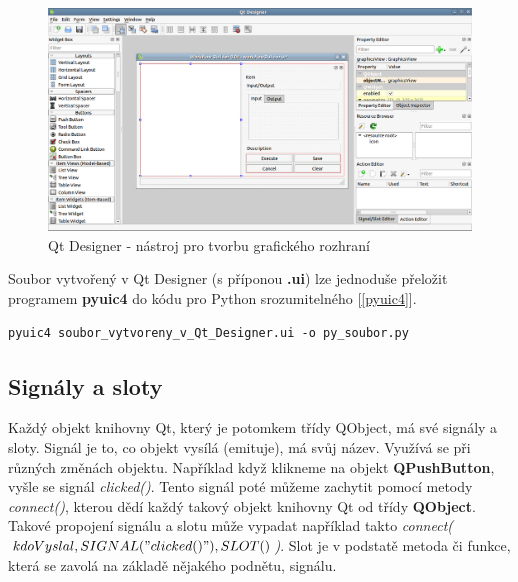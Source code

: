 \begin{figure}[h]
	\centering
	\includegraphics[scale=0.35]{pictures/qt/qt_designer}
	\caption{Qt Designer - nástroj pro tvorbu grafického rozhraní}
  	\label{qtdesigner}
\end{figure}

Soubor vytvořený v Qt Designer (s příponou \textbf{.ui}) lze jednoduše přeložit programem \textbf{pyuic4} do kódu pro Python srozumitelného [\autoref{pyuic4}]. \\

\newpage
\begin{lstlisting}[label=pyuic4,caption={pyuic4 - přeložení .ui souboru do pythoního kódu},morekeywords={pyuic4}]
		pyuic4 soubor_vytvoreny_v_Qt_Designer.ui -o py_soubor.py 
\end{lstlisting}

\newpage
\subsection{Signály a sloty}
Každý objekt knihovny Qt, který je potomkem třídy QObject, má své
signály a sloty. Signál je to, co objekt vysílá (emituje), má svůj
název. Využívá se při různých změnách objektu. Například když klikneme
na objekt \textbf{QPushButton}, vyšle se
signál \textit{clicked()}. Tento signál poté můžeme zachytit pomocí
metody \textit{connect()}, kterou dědí každý takový objekt knihovny Qt
od třídy \textbf{QObject}. Takové propojení signálu a slotu může
vypadat například
takto \textit{connect($kdoVyslal,SIGNAL("clicked()"), SLOT()$)}. Slot
je v podstatě metoda či funkce, která se zavolá na základě nějakého
podnětu, signálu.

